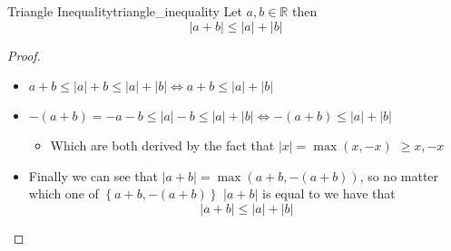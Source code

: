 \begin{theorem}{Triangle Inequality}{triangle_inequality}
    Let $ a, b \in \mathbb{R}$ then 
    \[
    \left| a  +  b \right| \le \left| a \right|  +  \left| b \right|
    \]
\end{theorem}
\begin{proof}
    \begin{itemize}
        \item $ a  +  b \le \left| a \right|  +  b \le \left| a  \right|  +  \left| b \right| \Leftrightarrow a  +  b \le \left| a \right|  +  \left| b \right|$ 
        \item $ - \left( a  +  b  \right) =   - a    - b \le \left|  a \right|   - b \le \left|   a \right|  +  \left|   b \right| \Leftrightarrow -\left( a  + b \right) \le \left| a \right|  +  \left| b \right|$ 
        \begin{itemize}
            \item Which are both derived by the fact that \hyperref[lemma:absolute_value_is_equal_to_max]{$ \left|x  \right| =  \max\left(x ,  - x\right)$} $\ge x,  - x$ 
        \end{itemize}
        \item Finally we can see that $ \left| a  +  b \right| =  \max\left(a  + b,   -  \left( a  +  b \right)\right)$, so no matter which one of $ \left\{ a  + b, -\left( a  +  b \right) \right\}$ $ \left| a  +  b \right|$ is equal to we have that
            \[
            \left| a  + b \right| \le \left| a  \right|  +  \left| b \right|
            \]
    \end{itemize}
\end{proof}
